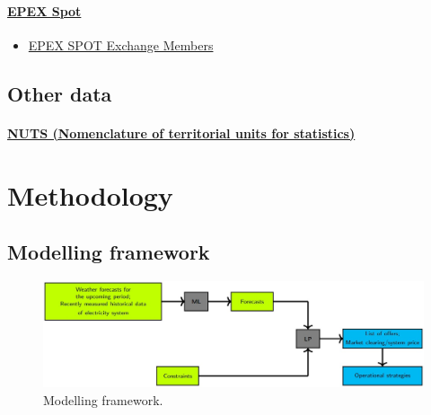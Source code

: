 \hypertarget{epex-spot}{%
\paragraph{\texorpdfstring{\href{https://www.epexspot.com/en/extras/download-center/market_data}{EPEX
Spot}}{EPEX Spot}}\label{epex-spot}}

\begin{itemize}
\tightlist
\item
  \href{https://www.epexspot.com/en/membership/list_of_members}{EPEX
  SPOT Exchange Members}
\end{itemize}

\hypertarget{other-data}{%
\subsection{Other data}\label{other-data}}

\hypertarget{nuts-nomenclature-of-territorial-units-for-statistics-1}{%
\paragraph{\texorpdfstring{\href{https://ec.europa.eu/eurostat/web/gisco/geodata/reference-data/administrative-units-statistical-units/nuts}{NUTS
(Nomenclature of territorial units for
statistics)}}{NUTS (Nomenclature of territorial units for statistics)}}\label{nuts-nomenclature-of-territorial-units-for-statistics-1}}

\hypertarget{methodology}{%
\section{Methodology}\label{methodology}}

\hypertarget{modelling-framework}{%
\subsection{Modelling framework}\label{modelling-framework}}

\begin{figure}
\centering
\includegraphics{images/model_framework.jpg}
\caption{Modelling framework.}
\end{figure}

